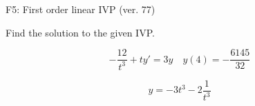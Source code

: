 \begin{exercise}
  \begin{exerciseTitle}F5: First order linear IVP (ver. 77)\end{exerciseTitle}
  \begin{exerciseStatement}
    
Find the solution to the given IVP.

    
\[-\frac{12}{t^{3}} +ty'= 3 y \hspace{1em} y( 4 ) = -\frac{6145}{32}\]

  \end{exerciseStatement}
  \begin{exerciseAnswer}
    
\[y= -3 t^ 3 -2 \frac{1}{t^{3}}\]

  \end{exerciseAnswer}
\end{exercise}